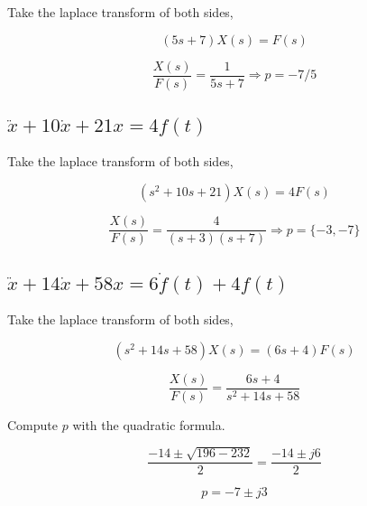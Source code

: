 \documentclass[12pt]{article}
\numberwithin{equation}{section}
\begin{document}
  Take the laplace transform of both sides,

  \begin{equation}
    (5s + 7)X(s) = F(s)
  \end{equation}

  \begin{equation}
    \frac{X(s)}{F(s)} = \frac{1}{5s + 7} \Rightarrow p = -7/5
  \end{equation}

  \subsection{$ \ddot x + 10\dot x + 21x = 4f(t)$}

  Take the laplace transform of both sides,

  \begin{equation}
    (s ^2 + 10s + 21) X(s) = 4F(s)
  \end{equation}

  \begin{equation}
    \frac{X(s)}{F(s)} = \frac{4}{(s+3)(s+7)} \Rightarrow p = \{-3, -7\}
  \end{equation}

  \subsection{$ \ddot x + 14\dot x + 58x = 6\dot f(t) + 4f(t)$}

  Take the laplace transform of both sides,

  \begin{equation}
    (s ^2 + 14s + 58)X(s) = (6s + 4)F(s)
  \end{equation}

  \begin{equation}
    \frac{X(s)}{F(s)} = \frac{6s + 4}{s ^2 + 14s + 58}
  \end{equation}

  Compute $ p $ with the quadratic formula.

  \begin{equation}
    \frac{-14 \pm \sqrt{196 - 232}}{2} = \frac{-14 \pm j6}{2}
  \end{equation}

  \begin{equation}
    p = -7 \pm j3
  \end{equation}





  \newpage
  \section{}
\end{document}
